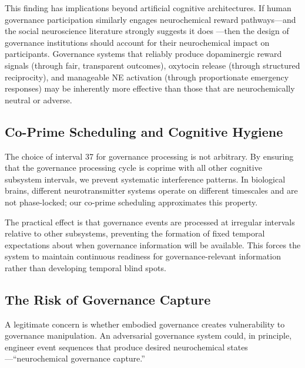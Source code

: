 \documentclass[11pt,a4paper]{article}
\begin{document}
This finding has implications beyond artificial cognitive architectures.
If human governance participation similarly engages neurochemical reward pathways---and the social neuroscience literature strongly suggests it does \citep{rilling2011neuroscience, zak2012moral}---then the design of governance institutions should account for their neurochemical impact on participants.
Governance systems that reliably produce dopaminergic reward signals (through fair, transparent outcomes), oxytocin release (through structured reciprocity), and manageable NE activation (through proportionate emergency responses) may be inherently more effective than those that are neurochemically neutral or adverse.

\subsection{Co-Prime Scheduling and Cognitive Hygiene}

The choice of interval 37 for governance processing is not arbitrary.
By ensuring that the governance processing cycle is coprime with all other cognitive subsystem intervals, we prevent systematic interference patterns.
In biological brains, different neurotransmitter systems operate on different timescales and are not phase-locked; our co-prime scheduling approximates this property.

The practical effect is that governance events are processed at irregular intervals relative to other subsystems, preventing the formation of fixed temporal expectations about when governance information will be available.
This forces the system to maintain continuous readiness for governance-relevant information rather than developing temporal blind spots.

\subsection{The Risk of Governance Capture}

A legitimate concern is whether embodied governance creates vulnerability to governance manipulation.
An adversarial governance system could, in principle, engineer event sequences that produce desired neurochemical states---``neurochemical governance capture.''
\end{document}
